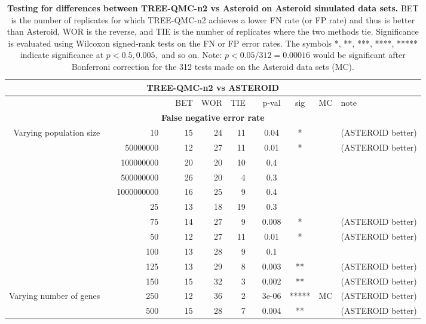 \begin{table}[!h]
\caption[Statistical testing for TREE-QMC-n2 vs Asteroid on Asteroid data]{
\textbf{Testing for differences between TREE-QMC-n2 vs Asteroid on Asteroid simulated data sets.}
BET is the number of replicates for which TREE-QMC-n2 achieves a lower FN rate (or FP rate) and thus is better than Asteroid, WOR is the reverse, and TIE is the number of replicates where the two methods tie.
Significance is evaluated using Wilcoxon signed-rank tests on the FN or FP error rates.
The symbols *, **, ***, ****, ***** indicate significance at $p < 0.5, 0.005,$ and so on.
Note: $p < 0.05 / 312 = 0.00016$ would be significant after Bonferroni correction for the 312 tests made on the Asteroid data sets (MC).}
\centering
\scriptsize
\begin{tabular}{r r r l r r r l c c c l}
\toprule 
\multicolumn{12}{c}{\textbf{TREE-QMC-n2 vs ASTEROID}} \\
\midrule
\multirow{ 1}{2cm}{}
& & & & BET & WOR & TIE & & p-val & sig & MC & note \\
\midrule
\multicolumn{12}{c}{\textbf{False negative error rate}} \\
\midrule
\multirow{ 6}{2cm}{Varying population size}
& & 10 & & 15 & 24 & 11 & & 0.04 & * &  & (ASTEROID better) \\
& & 50000000 & & 12 & 27 & 11 & & 0.01 & * &  & (ASTEROID better) \\
& & 100000000 & & 20 & 20 & 10 & & 0.4 &  &  &  \\
& & 500000000 & & 26 & 20 & 4 & & 0.3 &  &  &  \\
& & 1000000000 & & 16 & 25 & 9 & & 0.4 &  &  &  \\
\midrule
\multirow{ 6}{2cm}{Varying number of taxa}
& & 25 & & 13 & 18 & 19 & & 0.3 &  &  &  \\
& & 75 & & 14 & 27 & 9 & & 0.008 & * &  & (ASTEROID better) \\
& & 50 & & 12 & 27 & 11 & & 0.01 & * &  & (ASTEROID better) \\
& & 100 & & 13 & 28 & 9 & & 0.1 &  &  &  \\
& & 125 & & 13 & 29 & 8 & & 0.003 & ** &  & (ASTEROID better) \\
& & 150 & & 15 & 32 & 3 & & 0.002 & ** &  & (ASTEROID better) \\
\midrule
\multirow{ 4}{2cm}{Varying number of genes}
& & 250 & & 12 & 36 & 2 & & 3e-06 & ***** & MC & (ASTEROID better) \\
& & 500 & & 15 & 28 & 7 & & 0.004 & ** &  & (ASTEROID better) \\

\end{tabular}
\end{table}
